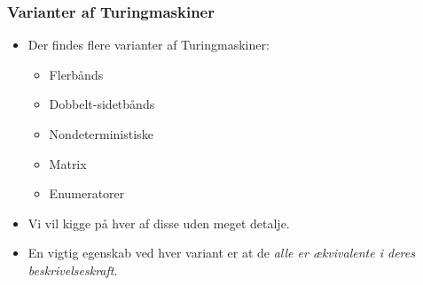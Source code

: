 \begin{frame}
  \frametitle{Varianter af Turingmaskiner}
  \begin{itemize}
    \item Der findes flere varianter af Turingmaskiner:
          \begin{itemize}
            \item Flerbånds
            \item Dobbelt-sidetbånds
            \item Nondeterministiske
            \item Matrix
            \item Enumeratorer
          \end{itemize}


    \item Vi vil kigge på hver af disse uden meget detalje.
    \item En vigtig egenskab ved hver variant er at de \textit{alle er ækvivalente i deres beskrivelseskraft}.
  \end{itemize}
\end{frame}

